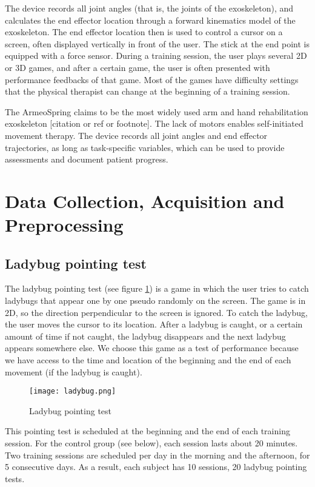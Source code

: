 The device records all joint angles (that is, the joints of the exoskeleton), and calculates the end effector location through a forward kinematics model of the exoskeleton. The end effector location then is used to control a cursor on a screen, often displayed vertically in front of the user. The stick at the end point is equipped with a force sensor. During a training session, the user plays several 2D or 3D games, and after a certain game, the user is often presented with performance feedbacks of that game. Most of the games have difficulty settings that the physical therapist can change at the beginning of a training session.

The ArmeoSpring claims to be the most widely used arm and hand rehabilitation exoskeleton [citation or ref or footnote]. The lack of motors enables self-initiated movement therapy. The device records all joint angles and end effector trajectories, as long as task-specific variables, which can be used to provide assessments and document patient progress.

\section{Data Collection, Acquisition and Preprocessing}
\label{datacollect}


\subsection{Ladybug pointing test}

The ladybug pointing test (see figure \ref{fig:ladybug}) is a game in which the user tries to catch ladybugs that appear one by one pseudo randomly on the screen. The game is in 2D, so the direction perpendicular to the screen is ignored. To catch the ladybug, the user moves the cursor to its location. After a ladybug is caught, or a certain amount of time if not caught, the ladybug disappears and the next ladybug appears somewhere else. We choose this game as a test of performance because we have access to the time and location of the beginning and the end of each movement (if the ladybug is caught).%

\begin{figure}
	\texttt{[image: ladybug.png]}
	\centering
	\caption{Ladybug pointing test}
	\label{fig:ladybug}
\end{figure}

This pointing test is scheduled at the beginning and the end of each training session. For the control group (see below), each session lasts about 20 minutes. Two training sessions are scheduled per day in the morning and the afternoon, for 5 consecutive days. As a result, each subject has 10 sessions, 20 ladybug pointing tests. 

